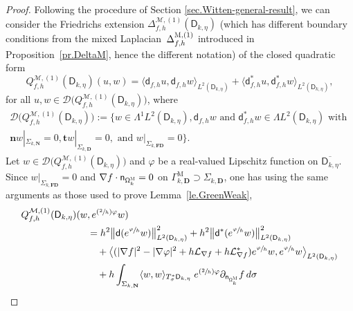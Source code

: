 \documentclass[10pt]{amsart}
\newcommand{\Psfrac}[2]{(\sfrac{#1}{#2})}
\newcommand{\mbf}[1]{\mathbf{#1}}
\theoremstyle{plain}
\theoremstyle{definition}
\begin{document}
\begin{proof}
Following the procedure of Section \ref{sec.Witten-general-result}, we
can consider the Friedrichs extension $\Delta_{f,h}^{
\mathcal M,(1)} (\mathsf D_{k,\eta})$ (which has different
boundary conditions from the mixed Laplacian~$\Delta_{f,h}^{
\textsc{M},(1)}$ introduced in Proposition~\ref{pr.DeltaM}, hence
the different notation) of the closed quadratic form\vspace*{-3pt}
\[
Q_{f,h}^{ \mathcal M,(1)} (\mathsf D_{k,\eta})(u,w)=\langle \mathsf d_{f,h} u,\mathsf d_{f,h}w \rangle_{L^2(\mathsf D_{k,\eta})} +\langle \mathsf d^*_{f,h}u,\mathsf d^*_{f,h}w \rangle_{L^2(\mathsf D_{k,\eta})},
\]
for all $u,w\in\mathcal D\bigl(Q_{f,h}^{ \mathcal M,(1)} (\mathsf D_{k,\eta})\bigr)$, where\vspace*{-5pt}
\begin{multline*}
\mathcal D\bigl(Q_{f,h}^{ \mathcal M,(1)} (\mathsf D_{k,\eta})\bigr):=\big \{w\in \Lambda^1L^2(\mathsf D_{k,\eta}), \mathsf d_{f,h}w \text{ and } \mathsf d^*_{f,h} w\in \Lambda L^2(\mathsf D_{k,\eta}) \text{ with }\\
\mathbf n w|_{\Sigma_{k,\mbf N} }=0, \mathbf t w|_{\Sigma_{k,\mbf D} }=0, \text{ and } 
w|_{\Sigma_{k,\mbf{FD}} }=0 \big\}.
\end{multline*}
Let $w\in \mathcal D\bigl(Q_{f,h}^{ \mathcal M,(1)} (\mathsf D_{k,\eta})\bigr)$ and $\varphi$ be a real-valued Lipschitz
function on $\overline{\mathsf D_{k,\eta}}$.
Since $w|_{\Sigma_{k,\mbf{FD}} }=0 $ and $\nabla f \cdot \mathsf n_{\mathsf \Omega_k^{\textsc{M}} }=0$ on $\Gamma_{k, \mbf D}^{\text{M}}\supset \Sigma_{k, \mbf D}$, one has using the same arguments as those used to prove Lemma~\ref{le.GreenWeak},
\begin{equation}
\label{eq.Spec2}
\begin{aligned}
Q_{f,h}^{ \mathcal M,(1)} (\mathsf D_{k,\eta})(w&,e^{\Psfrac 2h
\varphi} w)\\
&=
h^{2}\big \| \mathsf d (e^{\sfrac{\varphi}{h}} w)\big \|^{2}_{ L^{2} (\mathsf D_{k,\eta})}+
h^{2} \big \| \mathsf d^{*} (e^{\sfrac{\varphi}{h}} w) \big \|^{2}_{ L^{2} (\mathsf D_{k,\eta})}\\
&\quad + \big \langle
(|\nabla f|^{2}-|\nabla \varphi|^{2}+h\mathcal{L}_{\nabla
f}+h\mathcal{L}_{\nabla
f}^{*})e^{\sfrac{\varphi}{h}} w, e^{\sfrac{\varphi}{h}}
w\big \rangle_{ L^{2} (\mathsf D_{k,\eta})}\\
&\quad +h \int_{\Sigma_{k,\mbf N}}
\langle w,w
\rangle_{ T_{\sigma}^{*} \mathsf D_{k,\eta} }\;e^{\Psfrac{2 }{h}\varphi }\partial_{\mathsf n_{ \mathsf \Omega_k^{\textsc{M}} } }f\, d\sigma\\

\end{aligned}
\end{equation}
\end{proof}
\end{document}
